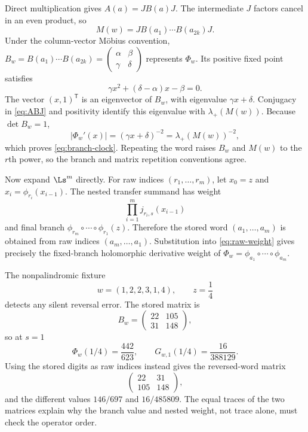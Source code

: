 Direct multiplication gives $A(a)=JB(a)J$.  The intermediate $J$ factors
cancel in an even product, so
\begin{equation}
  M(w)=J B(a_1)\cdots B(a_{2k})J.
  \label{eq:ABJ}
\end{equation}
Under the column-vector M\"obius convention,
$B_w=B(a_1)\cdots B(a_{2k})=
\left(\begin{smallmatrix}\alpha&\beta\\\gamma&\delta\end{smallmatrix}\right)$
represents $\Phi_w$.  Its positive fixed point satisfies
\[
  \gamma x^2+(\delta-\alpha)x-\beta=0.
\]
The vector $(x,1)^{\mathsf T}$ is an eigenvector of $B_w$, with eigenvalue
$\gamma x+\delta$.  Conjugacy in \eqref{eq:ABJ} and positivity identify this
eigenvalue with $\lambda_+(M(w))$.  Because $\det B_w=1$,
\[
  |\Phi_w'(x)|=(\gamma x+\delta)^{-2}=\lambda_+(M(w))^{-2},
\]
which proves \eqref{eq:branch-clock}.  Repeating the word raises $B_w$ and
$M(w)$ to the $r$th power, so the branch and matrix repetition conventions
agree.

Now expand $\Ls^{m}$ directly.  For raw indices $(r_1,\ldots,r_m)$, let
$x_0=z$ and $x_i=\phi_{r_i}(x_{i-1})$.  The nested transfer summand has weight
\begin{equation}
  \prod_{i=1}^{m}j_{r_i,s}(x_{i-1})
  \label{eq:raw-weight}
\end{equation}
and final branch
$\phi_{r_m}\circ\cdots\circ\phi_{r_1}(z)$.  Therefore the stored word
$(a_1,\ldots,a_m)$ is obtained from raw indices
$(a_m,\ldots,a_1)$.  Substitution into \eqref{eq:raw-weight} gives precisely
the fixed-branch holomorphic derivative weight of
$\Phi_w=\phi_{a_1}\circ\cdots\circ\phi_{a_m}$.

The nonpalindromic fixture
\[
  w=(1,2,2,3,1,4),\qquad z=\frac14
\]
detects any silent reversal error.  The stored matrix is
\[
  B_w=\begin{pmatrix}22&105\\31&148\end{pmatrix},
\]
so at $s=1$
\[
  \Phi_w(1/4)=\frac{442}{623},
  \qquad G_{w,1}(1/4)=\frac{16}{388129}.
\]
Using the stored digits as raw indices instead gives the reversed-word
matrix
\[
  \begin{pmatrix}22&31\\105&148\end{pmatrix},
\]
and the different values $146/697$ and $16/485809$.  The equal traces of the
two matrices explain why the branch value and nested weight, not trace alone,
must check the operator order.

